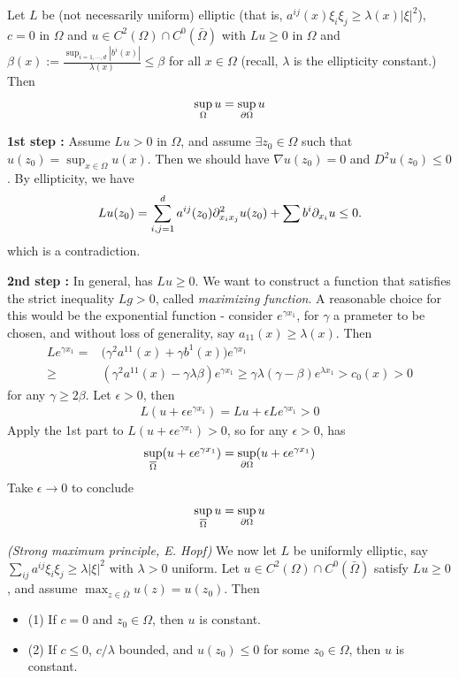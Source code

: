 \documentclass[12pt,a4paper]{article}
\newenvironment{proof}
{\begin{changemargin}{0.5cm}{0.5cm} 
	}%
	{\end{changemargin}
}
\renewenvironment{i}
{\begin{itemize} 
	}%
	{\end{itemize}
}
\newenvironment{p}
{\begin{proof} 
	}%
	{\end{proof}
}
\begin{document}
\thm Let $L$ be (not necessarily uniform) elliptic (that is, $a^{ij}(x) \xi_i \xi_j \geq \lambda(x) |\xi|^2$), $c=0$ in $\Omega$ and $u\in C^2(\Omega) \cap C^0(\bar{\Omega})$ with $Lu \geq 0$ in $\Omega$ and $\beta(x) := \frac{\sup_{i=1,\cdots,d} |b^i(x)|}{\lambda (x)} \leq\beta$ for all $x\in \Omega$ (recall, $\lambda$ is the ellipticity constant.) Then
\begin{align*}
\sup_{\Omega} u = \sup_{\partial \Omega} u
\end{align*}
\begin{p}
\pf \textbf{1st step :} Assume $Lu >0$ in $\Omega$, and assume $\exists z_0 \in \Omega$ such that $u(z_0) = \sup_{x\in \Omega} u(x)$. Then we should have $\nabla u(z_0) =0$ and $D^2 u(z_0) \leq 0$. By ellipticity, we have 
\begin{align*}
Lu(z_0) = \sum_{i,j=1}^d a^{ij}(z_0) \partial^2_{x_i x_j} u(z_0) + \sum b^i \partial_{x_i} u \leq 0.
\end{align*}
which is a contradiction.
\s

\textbf{2nd step :} In general, has $Lu \geq 0$. We want to construct a function that satisfies the strict inequality $Lg > 0$, called \emph{maximizing function}. A reasonable choice for this would be the exponential function - consider $e^{\gamma x_1}$, for $\gamma$ a prameter to be chosen, and without loss of generality, say $a_{11}(x) \geq \lambda(x)$. Then
\begin{align*}
Le^{\gamma x_1} = & \big( \gamma^2 a^{11}(x) + \gamma b^1(x) \big) e^{\gamma x_1} \\
\geq & (\gamma^2 a^{11}(x) - \gamma \lambda \beta )e^{\gamma x_1} \geq \gamma \lambda (\gamma - \beta) e^{\lambda x_1} > c_0(x) > 0
\end{align*}
for any $\gamma \geq 2\beta$. Let $\epsilon >0$, then
\begin{align*}
L (u + \epsilon e^{\gamma x_1}) = Lu + \epsilon L e^{\gamma x_1} >0
\end{align*}
Apply the 1st part to $L(u + \epsilon e^{\gamma x_1}) >0$, so for any $\epsilon >0$, has
\begin{align*}
\sup_{\overline{\Omega}} (u + \epsilon e^{\gamma x_1}) = \sup_{\partial \Omega} (u + \epsilon e^{\gamma x_1})
\end{align*}
Take $\epsilon \rightarrow 0$ to conclude
\begin{align*}
\sup_{\overline{\Omega}} u = \sup_{\partial \Omega} u
\end{align*}
\eop
\end{p}
\s

\thm \emph{(Strong maximum principle, E. Hopf)}  We now let $L$ be uniformly elliptic, say $\sum_{ij} a^{ij} \xi_i \xi_j \geq \lambda |\xi|^2$ with $\lambda>0$ uniform. Let $u\in C^2(\Omega) \cap C^0(\bar{\Omega})$ satisfy $Lu \geq 0$, and assume $\max_{z\in \bar{\Omega}} u(z) = u(z_0)$. Then
\begin{i}
\item[(1)] If $c=0$ and $z_0 \in \Omega$, then $u$ is constant.
\item[(2)] If $c\leq 0$, $c/\lambda$ bounded, and $u(z_0) \leq 0$ for some $z_0 \in \Omega$, then $u$ is constant.
\end{i}
\s
\end{document}

